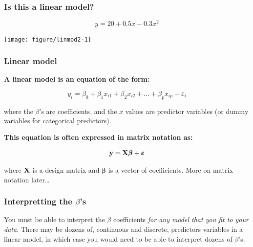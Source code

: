 \documentclass[color=usenames,dvipsnames]{beamer}\usepackage[]{graphicx}\usepackage[]{color}
\begin{document}
\begin{frame}[fragile]
  \frametitle{Is this a linear model?}
\[
y = 20 + 0.5 x - 0.3 x^2
\]

\begin{center}
  \texttt{[image: figure/linmod2-1]}
\end{center}
\end{frame}





\begin{frame}
  \frametitle{Linear model}
{\bf A linear model is an equation of the form:}

\[
y_i = \beta_0 + \beta_1 x_{i1} + \beta_2 x_{i2} + \ldots + \beta_p x_{ip} + \varepsilon_i
\]

where the $\beta$'s are coefficients, and the $x$ values are predictor
variables (or dummy variables for categorical predictors).
\pause

\vspace{0.5cm}

{\bf This equation is often expressed in matrix notation as:}

\[
{\bf y} = {\bf X} {\bm{\beta}} + {\bm \varepsilon}
\]

where $\bf X$ is a \alert{design matrix} and $\bm{\beta}$ is a
vector of coefficients. \pause More on matrix notation later\dots
\end{frame}






\begin{frame}
  \frametitle{Interpretting the $\beta$'s}
You must be able to interpret the $\beta$
coefficients {\it for any model that you fit to your data}. 
\pause
\vfill
There may be dozens of, continuous and discrete, predictors variables
in a linear model, in which case you would need to be able to
interpret dozens of $\beta$'s. 
\end{frame}
\end{document}
